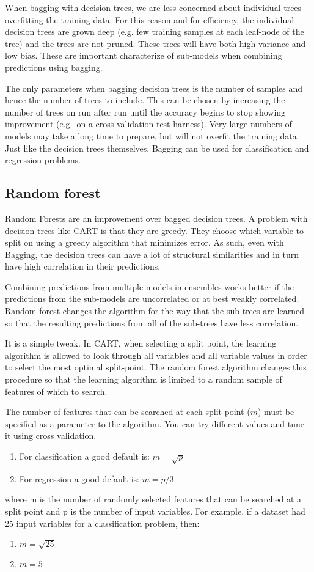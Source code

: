 \documentclass{book}
\begin{document}
When bagging with decision trees, we are less concerned about individual trees overfitting the training data. For this reason and for efficiency, the individual decision trees are grown deep (e.g. few training samples at each leaf-node of the tree) and the trees are not pruned. These trees will have both high variance and low bias. These are important characterize of sub-models when combining predictions using bagging.

The only parameters when bagging decision trees is the number of samples and hence the number of trees to include. This can be chosen by increasing the number of trees on run after run until the accuracy begins to stop showing improvement (e.g.\ on a cross validation test harness). Very large numbers of models may take a long time to prepare, but will not overfit the training data.
Just like the decision trees themselves, Bagging can be used for classification and regression problems.

\subsection{Random forest}
Random Forests are an improvement over bagged decision trees. A problem with decision trees like CART is that they are greedy. They choose which variable to split on using a greedy algorithm that minimizes error. As such, even with Bagging, the decision trees can have a lot of structural similarities and in turn have high correlation in their predictions.

Combining predictions from multiple models in ensembles works better if the predictions from the sub-models are uncorrelated or at best weakly correlated. Random forest changes the algorithm for the way that the sub-trees are learned so that the resulting predictions from all of the sub-trees have less correlation.

It is a simple tweak. In CART, when selecting a split point, the learning algorithm is allowed to look through all variables and all variable values in order to select the most optimal split-point. The random forest algorithm changes this procedure so that the learning algorithm is limited to a random sample of features of which to search.

The number of features that can be searched at each split point ($m$) must be specified as a parameter to the algorithm. You can try different values and tune it using cross validation.
\begin{enumerate} \addtolength{\itemsep}{-0.5\baselineskip}
\item For classification a good default is: $m = \sqrt{p}$
\item For regression a good default is: $m = p/3$
\end{enumerate}
where m is the number of randomly selected features that can be searched at a split point and p is the number of input variables. For example, if a dataset had 25 input variables for a classification problem, then:
\begin{enumerate} \addtolength{\itemsep}{-0.5\baselineskip}
\item $m = \sqrt{25}$
\item $m = 5$
\end{enumerate}
\end{document}

